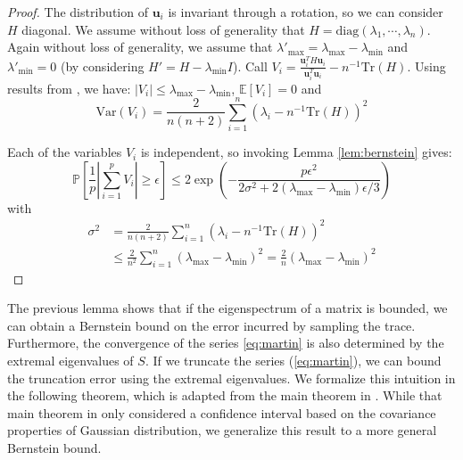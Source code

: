 \begin{proof}
The distribution of $\mathbf{u}_{i}$ is invariant through a rotation,
so we can consider $H$ diagonal. We assume without loss of generality
that $H=\text{diag}\left(\lambda_{1},\cdots,\lambda_{n}\right)$.
Again without loss of generality, we assume that $\lambda'_{\max}=\lambda_{\max}-\lambda_{\min}$
and $\lambda'_{\min}=0$ (by considering $H'=H-\lambda_{\min}I$).
Call $V_{i}=\frac{\mathbf{u}_{i}^{T}H\mathbf{u}_{i}}{\mathbf{u}_{i}^{T}\mathbf{u}_{i}}-n^{-1}\text{Tr}\left(H\right)$.
Using results from \cite{Barry1999}, we have: $\left|V_{i}\right|\leq\lambda_{\max}-\lambda_{\min}$,
$\mathbb{E}\left[V_{i}\right]=0$ and 
\[
\text{Var}\left(V_{i}\right)=\frac{2}{n(n+2)}\sum_{i=1}^{n}\left(\lambda_{i}-n^{-1}\text{Tr}\left(H\right)\right)^{2}
\]


Each of the variables $V_{i}$ is independent, %
so invoking Lemma \ref{lem:bernstein} gives: 
\[
\mathbb{P}\left[\frac{1}{p}\left|\sum_{i=1}^{p}V_{i}\right|\geq\epsilon\right]\leq2\exp\left(-\frac{p\epsilon^{2}}{2\sigma^{2}+2\left(\lambda_{\max}-\lambda_{\min}\right)\epsilon/3}\right)
\]
with 
\begin{align*}
\sigma^{2} & =\frac{2}{n(n+2)}\sum_{i=1}^{n}\left(\lambda_{i}-n^{-1}\text{Tr}\left(H\right)\right)^{2}\\
 & \leq\frac{2}{n^{2}}\sum_{i=1}^{n}\left(\lambda_{\max}-\lambda_{\min}\right)^{2}=\frac{2}{n}\left(\lambda_{\max}-\lambda_{\min}\right)^{2}
\end{align*}

\end{proof}
The previous lemma shows that if the eigenspectrum of a matrix is
bounded, we can obtain a Bernstein bound on the error incurred by
sampling the trace. Furthermore, the convergence of the series \eqref{eq:martin}
is also determined by the extremal eigenvalues of $S$. If we truncate
the series (\ref{eq:martin}), we can bound the truncation error using
the extremal eigenvalues. We formalize this intuition in the following
theorem, which is adapted from the main theorem in \cite{Barry1999}.
While that main theorem in \cite{Barry1999} only considered a confidence
interval based on the covariance properties of Gaussian distribution,
we generalize this result to a more general Bernstein bound. 
